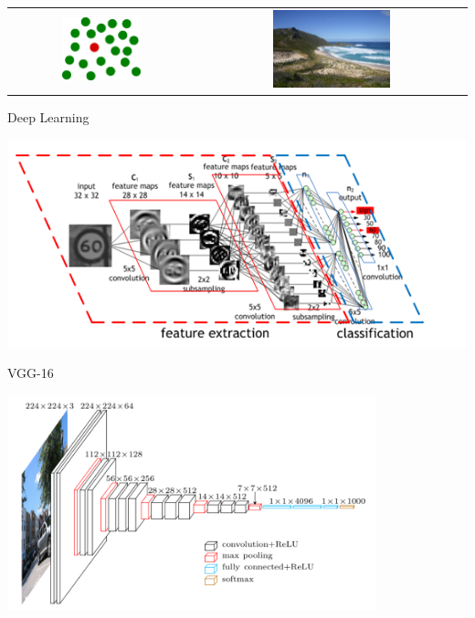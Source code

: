 \documentclass[10pt]{beamer}
\begin{document}
\begin{frame}{}
    \begin{center}
        \begin{tabular} {cc}
        \includegraphics[width=0.45\textwidth]{./img/red_in_green.png} &
        \includegraphics[width=0.45\textwidth]{./img/cliff.jpg}
        \end{tabular}
    \end{center}
\end{frame}

\begin{frame}{Deep Learning}
    \begin{center}
        \includegraphics[width=1.0\textwidth]{./img/convnet.png}
    \end{center}
\end{frame}

\begin{frame}{VGG-16}
    \begin{center}
        \includegraphics[width=0.8\textwidth]{./img/vgg16.png}
    \end{center}
\end{frame}
\end{document}

